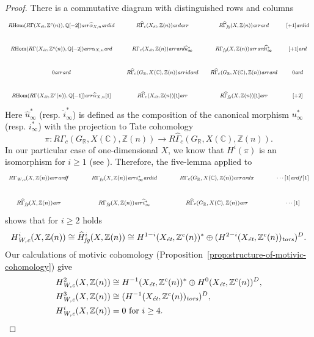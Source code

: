 \documentclass[draft]{article}
\DeclareMathOperator{\Hom}{Hom}
\newcommand{\CC}{\mathbb{C}}
\newcommand{\QQ}{\mathbb{Q}}
\newcommand{\RR}{\mathbb{R}}
\newcommand{\ZZ}{\mathbb{Z}}
\newcommand{\ar}{\text{\it ar}}
\newcommand{\et}{\text{\it \'{e}t}}
\newcommand{\fg}{\text{\it fg}}
\newcommand{\tors}{\text{\it tors}}
\newcommand{\Wc}{\text{\it W,c}}
\newcommand{\RHom}{R\!\Hom}
\theoremstyle{myplain}
\theoremstyle{mydefinition}
\numberwithin{equation}{section}
\begin{document}
\begin{proof}
  There is a commutative diagram with distinguished rows and columns
  \[ \begin{tikzcd}[font=\footnotesize,column sep=1em]
      \RHom (R\Gamma (X_\et, \ZZ^c(n)), \QQ[-2]) \ar{r}{\widehat{\alpha}_{X,n}} \ar{d}{id} &[0pt] R\widehat{\Gamma}_c (X_\et, \ZZ(n)) \ar{d} \ar{r} & R\widehat{\Gamma}_\fg (X, \ZZ(n)) \ar{r}\ar{d} &[-0.5em] {[+1]} \ar{d}{id} \\
      \RHom (R\Gamma (X_\et, \ZZ^c(n)), \QQ[-2]) \ar{r}{\alpha_{X,n}} \ar{d} & R\Gamma_c (X_\et, \ZZ(n)) \ar{r} \ar{d}{\widehat{u}^*_\infty} & R\Gamma_\fg (X, \ZZ(n)) \ar{r} \ar{d}{\widehat{i}^*_\infty} & {[+1]} \ar{d} \\
      0 \ar{r}\ar{d} & R\widehat{\Gamma}_c (G_\RR, X(\CC), \ZZ(n)) \ar{r}{id} \ar{d} & R\widehat{\Gamma}_c (G_\RR, X(\CC), \ZZ(n)) \ar{r} \ar{d} & 0 \ar{d} \\
      \RHom (R\Gamma (X_\et, \ZZ^c(n)), \QQ[-1]) \ar{r}{\widehat{\alpha}_{X,n} [1]} & R\widehat{\Gamma}_c (X_\et, \ZZ(n)) [1] \ar{r} & R\widehat{\Gamma}_\fg (X, \ZZ(n)) [1] \ar{r} & {[+2]}
    \end{tikzcd} \]
  Here $\widehat{u}^*_\infty$ (resp. $\widehat{i}^*_\infty$)
  is defined as the composition of the canonical morphism $u^*_\infty$
  (resp. $i^*_\infty$) with the projection to Tate cohomology
  \[
    \pi\colon R\Gamma_c (G_\RR, X(\CC), \ZZ(n)) \to
    R\widehat{\Gamma}_c (G_\RR, X(\CC), \ZZ(n)).
  \]
  In our particular case of one-dimensional $X$, we know that $H^i (\pi)$ is an
  isomorphism for $i \ge 1$
  (see \cite[Proposition~3.2]{Beshenov-Weil-etale-1}). Therefore, the five-lemma
  applied to
  \[ \begin{tikzcd}[font=\footnotesize]
      R\Gamma_\Wc (X, \ZZ(n)) \ar{r}\ar{d}{f} & R\Gamma_\fg (X, \ZZ(n)) \ar{r}{i^*_\infty}\ar{d}{id} & R\Gamma_c (G_\RR, X(\CC), \ZZ(n)) \ar{r}\ar{d}{\pi} & \cdots [1]\ar{d}{f [1]} \\
      R\widehat{\Gamma}_\fg (X, \ZZ(n)) \ar{r} & R\Gamma_\fg (X, \ZZ(n)) \ar{r}{\widehat{i}^*_\infty} & R\widehat{\Gamma}_c (G_\RR, X(\CC), \ZZ(n)) \ar{r} & \cdots [1]
    \end{tikzcd} \]
  shows that for $i \ge 2$ holds
  \[ H^i_\Wc (X, \ZZ(n)) \cong \widehat{H}^i_\fg (X, \ZZ(n))
    \cong H^{1-i} (X_\et, \ZZ^c(n))^*
    \oplus
    (H^{2-i} (X_\et, \ZZ^c (n))_\tors)^D. \]
  Our calculations of motivic cohomology
  (Proposition~\ref{prop:structure-of-motivic-cohomology}) give
  \begin{align*}
    H^2_\Wc (X, \ZZ(n)) & \cong H^{-1} (X_\et, \ZZ^c(n))^*
                          \oplus
                          H^0 (X_\et, \ZZ^c (n))^D, \\
    H^3_\Wc (X, \ZZ(n)) & \cong (H^{-1} (X_\et, \ZZ^c (n))_\tors)^D, \\
    H^i_\Wc (X, \ZZ(n)) & = 0 \text{ for }i \ge 4. \qedhere
  \end{align*}
\end{proof}
\end{document}
